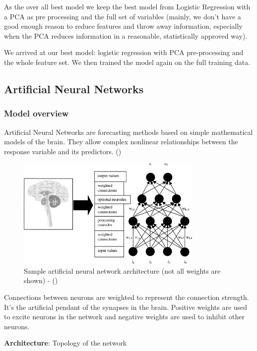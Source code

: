 \documentclass[]{article}
\begin{document}
As the over all best model we keep the best model from Logistic
Regression with a PCA as pre processing and the full set of variables
(mainly, we don't have a good enough reason to reduce features and throw
away information, especially when the PCA reduces information in a
reasonable, statistically approved way).

We arrived at our best model: logistic regression with PCA
pre-processing and the whole feature set. We then trained the model
again on the full training data.

\subsection{Artificial Neural
Networks}\label{artificial-neural-networks}

\subsubsection{Model overview}\label{model-overview}

Artificial Neural Networks are forecasting methods based on simple
mathematical models of the brain. They allow complex nonlinear
relationships between the response variable and its predictors.
(\cite{otexts})

\begin{figure}
    \centering
    \includegraphics[width=0.8\textwidth]{images/ann.jpg}
    \caption{Sample artificial neural network architecture (not all weights are shown) - (\cite{ann})}
    \label{fig:ann}
\end{figure}

Connections between neurons are weighted to represent the connection
strength. It's the artificial pendant of the synapses in the brain.
Positive weights are used to excite neurons in the network and negative
weights are used to inhibit other neurons.

\textbf{Architecture}: Topology of the network
\end{document}
